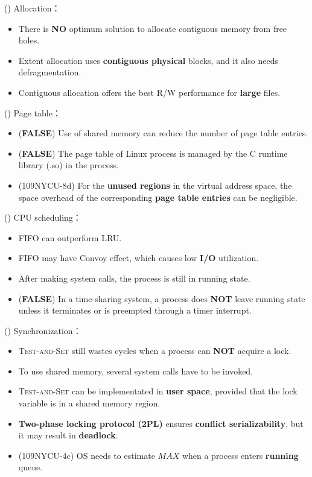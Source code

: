 \begin{theorem}{()} Allocation： \begin{itemize}
        \item There is \textbf{NO} optimum solution to allocate contiguous memory from free holes.
        \item Extent allocation uses \textbf{contiguous physical} blocks, and it also needs defragmentation.
        \item Contiguous allocation offers the best R/W performance for \textbf{large} files.
    \end{itemize}
\end{theorem}

\begin{theorem}{()} Page table： \begin{itemize}
        \item (\textbf{FALSE}) Use of shared memory can reduce the number of page table entries.
        \item (\textbf{FALSE}) The page table of Linux process is managed by the C runtime library (.so) in the process.
        \item (109NYCU-8d) For the \textbf{unused regions} in the virtual address space, the space overhead of the corresponding \textbf{page table entries} can be negligible.
    \end{itemize}
\end{theorem}

\begin{theorem}{()} CPU scheduling： \begin{itemize}
        \item FIFO can outperform LRU.
        \item FIFO may have Convoy effect, which causes low \textbf{I/O} utilization.
        \item After making system calls, the process is still in running state.
        \item (\textbf{FALSE}) In a time-sharing system, a process does \textbf{NOT} leave running state unless it terminates or is preempted through a timer interrupt. 
    \end{itemize}
\end{theorem}

\begin{theorem}{()} Synchronization： \begin{itemize}
        \item \textsc{Test-and-Set} still wastes cycles when a process can \textbf{NOT} acquire a lock. 
        \item To use shared memory, several system calls have to be invoked.
        \item \textsc{Test-and-Set} can be implementated in \textbf{user space}, provided that the lock variable is in a shared memory region.
        \item \textbf{Two-phase locking protocol (2PL)} ensures \textbf{conflict serializability}, but it may result in \textbf{deadlock}.
        \item (109NYCU-4c) OS needs to estimate $MAX$ when a process enters \textbf{running} queue.
    \end{itemize}
\end{theorem}

